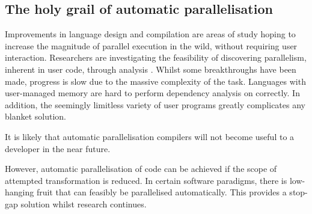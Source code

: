\subsection{The holy grail of automatic parallelisation}
Improvements in language design and compilation are areas of study hoping to increase the magnitude of parallel execution in the wild, without requiring user interaction.
Researchers are investigating the feasibility of discovering parallelism, inherent in user code, through analysis \cite{auto_par}.
Whilst some breakthroughs have been made, progress is slow due to the massive complexity of the task.
Languages with user-managed memory are hard to perform dependency analysis on correctly. In addition, the seemingly limitless variety of user programs greatly complicates any blanket solution.

It is likely that automatic parallelisation compilers will not become useful to a developer  in the near future.

However, automatic parallelisation of code can be achieved if the scope of attempted transformation is reduced. In certain software paradigms, there is low-hanging fruit that can feasibly be parallelised automatically. This provides a stop-gap solution whilst research continues.
